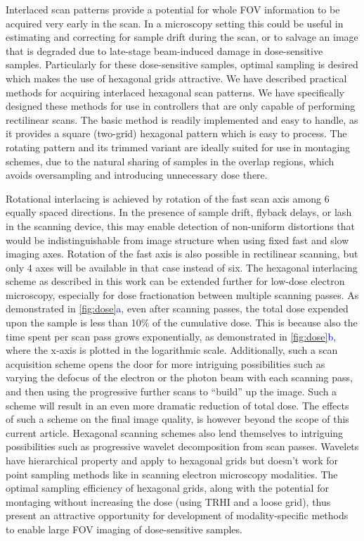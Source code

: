 \documentclass[aip, amsmath, amssymb, nobibnotes, nofootinbib, citeautoscript, reprint, superscriptaddress]{revtex4-2}
\newcommand*{\blu}{\textcolor{blue}}
\begin{document}
    Interlaced scan patterns provide a potential for whole FOV information to be acquired very early in the scan.
    In a microscopy setting this could be useful in estimating and correcting for sample drift during the scan, or to salvage an image that is degraded due to late-stage beam-induced damage in dose-sensitive samples.
    Particularly for these dose-sensitive samples, optimal sampling is desired which makes the use of hexagonal grids attractive.
    We have described practical methods for acquiring interlaced hexagonal scan patterns.
    We have specifically designed these methods for use in controllers that are only
    capable of performing rectilinear scans.
    The basic method is readily implemented and easy to handle, as it provides a square (two-grid) hexagonal pattern which is easy to process.
    The rotating pattern and its trimmed variant are ideally suited for use in montaging schemes, due to the natural sharing of samples in the overlap regions, which avoids oversampling and introducing unnecessary dose there.

    Rotational interlacing is achieved by rotation of the fast scan axis among 6 equally spaced directions.
    In the presence of sample drift, flyback delays, or lash in the scanning device, this may enable detection of non-uniform distortions that would be indistinguishable from image structure when using fixed fast and slow imaging axes.
    Rotation of the fast axis is also possible in rectilinear scanning, but only 4 axes will be available in that case instead of six.
    The hexagonal interlacing scheme as described in this work can be extended further for low-dose electron microscopy, especially for dose fractionation between multiple scanning passes. 
    As demonstrated in \autoref{fig:dose}\blu{a}, even after scanning passes, the total dose expended upon the sample is less than 10\% of the cumulative dose. 
    This is because also the time spent per scan pass grows exponentially, as demonstrated in \autoref{fig:dose}\blu{b}, where the x-axis is plotted in the logarithmic scale.
    Additionally, such a scan acquisition scheme opens the door for more intriguing possibilities such as varying the defocus of the electron or the photon beam with each scanning pass, and then using the progressive further scans to ``build'' up the image. 
    Such a scheme will result in an even more dramatic reduction of total dose. 
    The effects of such a scheme on the final image quality, is however beyond the scope of this current article.
    Hexagonal scanning schemes also lend themselves to intriguing possibilities such as progressive wavelet decomposition from scan passes.
    Wavelets have hierarchical property and apply to hexagonal grids \cite{hex_compression} but doesn't work for point sampling methods like in scanning electron microscopy modalities.
    The optimal sampling efficiency of hexagonal grids, along with the potential for montaging without increasing the dose (using TRHI and a loose grid), thus present an attractive opportunity for development of modality-specific methods to enable large FOV imaging of dose-sensitive samples.
\end{document}

